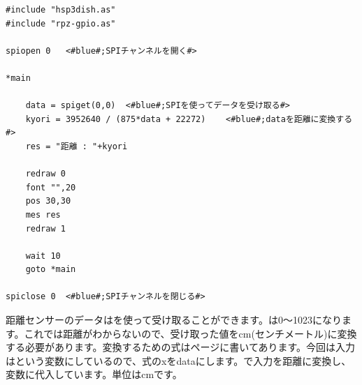 \begin{lstlisting}[caption=kyori.hsp,label=kyori.hsp]
#include "hsp3dish.as"
#include "rpz-gpio.as"

spiopen 0	<#blue#;SPIチャンネルを開く#>

*main

	data = spiget(0,0)	<#blue#;SPIを使ってデータを受け取る#>
	kyori = 3952640 / (875*data + 22272)	<#blue#;dataを距離に変換する#>
	res = "距離 : "+kyori
	
	redraw 0
	font "",20
	pos 30,30
	mes res
	redraw 1

	wait 10
	goto *main

spiclose 0	<#blue#;SPIチャンネルを閉じる#>
\end{lstlisting}

距離センサーのデータはを使って受け取ることができます。は0～1023になります。これでは距離がわからないので、受け取った値をcm(センチメートル)に変換する必要があります。変換するための式は\pageref{distance}ページに書いてあります。今回は入力はという変数にしているので、式のxをdataにします。で入力を距離に変換し、変数に代入しています。単位はcmです。\\

\begin{tcolorbox}[title=\useOmetoi]
\begin{enumerate}
\end{enumerate}
\end{tcolorbox}
